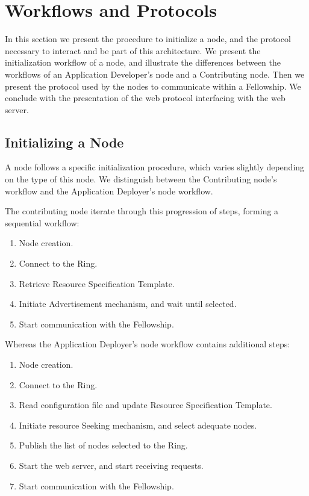 \documentclass[12pt, titlepage]{uo_temp}
\begin{document}
     \section{Workflows and Protocols}
     In this section we present the procedure to initialize a node, and the protocol
     necessary to interact and be part of this architecture. We present the initialization
     workflow of a node, and illustrate the differences between the workflows of an
     Application Developer's node and a Contributing node. Then we present the protocol
     used by the nodes to communicate within a Fellowship. We conclude with the
     presentation of the web protocol interfacing with the web server.
     
     \subsection{Initializing a Node}
     A node follows a specific initialization procedure, which varies slightly depending
     on the type of this node. We distinguish between the Contributing node's workflow and
     the Application Deployer's node workflow.
   
     The contributing node iterate through this progression of steps, forming a sequential
     workflow:
     \begin{enumerate}
       \item Node creation.
       \item Connect to the Ring.
       \item Retrieve Resource Specification Template.
       \item Initiate Advertisement mechanism, and wait until selected.
       \item Start communication with the Fellowship.
     \end{enumerate}
    
     Whereas the Application Deployer's node workflow contains additional steps:
     \begin{enumerate}
       \item Node creation.
       \item Connect to the Ring.
       \item Read configuration file and update Resource Specification Template.
       \item Initiate resource Seeking mechanism, and select adequate nodes.
       \item Publish the list of nodes selected to the Ring.
       \item Start the web server, and start receiving requests.
       \item Start communication with the Fellowship.
     \end{enumerate}
    
\end{document}
